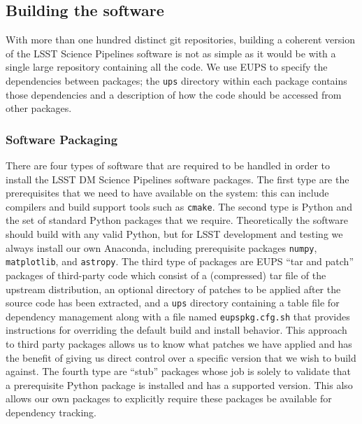 \subsection{Building the software}
\label{sec:buildsw}

With more than one hundred distinct git repositories, building a coherent version of the LSST Science Pipelines software is not as simple as it would be with a single large repository containing all the code.
We use EUPS to specify the dependencies between packages; the \texttt{ups} directory within each package contains those dependencies and a description of how the code should be accessed from other packages.

\subsubsection{Software Packaging}

There are four types of software that are required to be handled in order to install the LSST DM Science Pipelines software packages.
The first type are the prerequisites that we need to have available on the system: this can include compilers and build support tools such as \texttt{cmake}.
The second type is Python and the set of standard Python packages that we require.
Theoretically the software should  build with any valid Python, but for LSST development and testing we always install our own Anaconda, including prerequisite packages \texttt{numpy},\cite{numpy} \texttt{matplotlib},\cite{doi:10.1109/MCSE.2007.55} and \texttt{astropy}\cite{2018arXiv180102634T}.
The third type of packages are EUPS ``tar and patch'' packages of third-party code
which  consist of a (compressed) tar file of the upstream distribution, an optional directory of patches to be applied after the source code has been extracted, and a \texttt{ups} directory containing a table file for dependency management along with a file named \texttt{eupspkg.cfg.sh} that provides instructions for overriding the default build and install behavior.
This approach to third party packages allows us to know what patches we have applied and has the benefit of giving us direct control over a specific version that we wish to build against.
The fourth type are ``stub'' packages whose job is solely to validate that a prerequisite Python package is installed and has a supported version.
This also allows our own packages to explicitly require these packages be available for dependency tracking.

